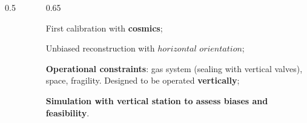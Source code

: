 \documentclass{beamer}
\begin{document}
\begin{frame}
\begin{columns}
\begin{column}{0.5 \framewidth}
\begin{figure}[!h]
    \label{fig:gassystem}
\end{figure}
        \end{column}
        \begin{column}{0.65 \framewidth}
        \vspace{-0.5mm}
                                \setlength{\leftmargini}{0.3em}
            \begin{itemize}
               {\small 
               \item First calibration with \textbf{cosmics};
               \vspace{-0.5mm}
               \item Unbiased reconstruction with $horizontal$ $orientation$; 
                              \vspace{-0.5mm}
               \item \textbf{Operational constraints}: gas system (sealing with vertical valves), space, fragility. Designed to be operated \textbf{vertically};
                 \vspace{-0.5mm}
               \item \textbf{Simulation with vertical station to assess biases and feasibility}.}
            \end{itemize}
        \end{column}
    \end{columns}
\end{frame}
\end{document}
